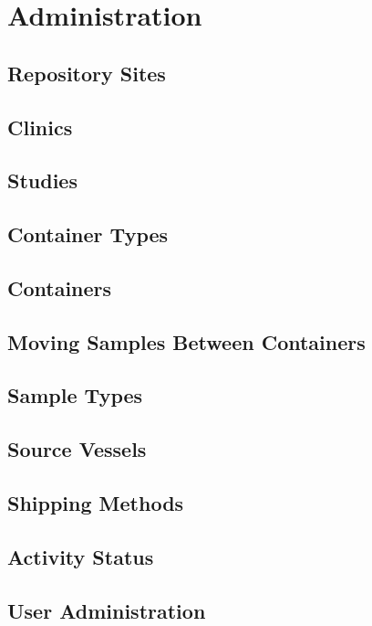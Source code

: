 \chapter{Administration}
\label{chap:administration}

\section{Repository Sites}
\section{Clinics}
\section{Studies}
\section{Container Types}
\section{Containers}
\section{Moving Samples Between Containers}
\section{Sample Types}
\section{Source Vessels}
\section{Shipping Methods}
\section{Activity Status}
\section{User Administration}

